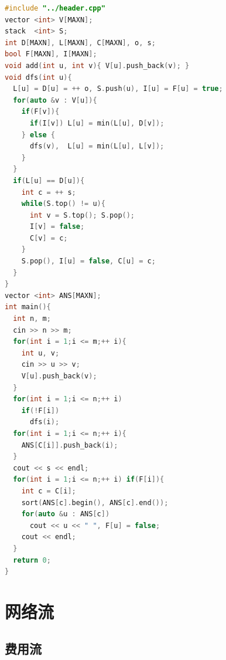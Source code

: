 \documentclass[10pt]{ctexart}
\begin{document}
\begin{multicols}{3}
\begin{lstlisting}[language={C++}]
#include "../header.cpp"
vector <int> V[MAXN];
stack  <int> S;
int D[MAXN], L[MAXN], C[MAXN], o, s;
bool F[MAXN], I[MAXN];
void add(int u, int v){ V[u].push_back(v); }
void dfs(int u){
  L[u] = D[u] = ++ o, S.push(u), I[u] = F[u] = true;
  for(auto &v : V[u]){
    if(F[v]){
      if(I[v]) L[u] = min(L[u], D[v]);
    } else {
      dfs(v),  L[u] = min(L[u], L[v]);
    }
  }
  if(L[u] == D[u]){
    int c = ++ s;
    while(S.top() != u){
      int v = S.top(); S.pop();
      I[v] = false;
      C[v] = c;
    }
    S.pop(), I[u] = false, C[u] = c;
  }
}
vector <int> ANS[MAXN];
int main(){
  int n, m;
  cin >> n >> m;
  for(int i = 1;i <= m;++ i){
    int u, v;
    cin >> u >> v;
    V[u].push_back(v);
  }
  for(int i = 1;i <= n;++ i)
    if(!F[i])
      dfs(i);
  for(int i = 1;i <= n;++ i){
    ANS[C[i]].push_back(i);
  }
  cout << s << endl;
  for(int i = 1;i <= n;++ i) if(F[i]){
    int c = C[i];
    sort(ANS[c].begin(), ANS[c].end());
    for(auto &u : ANS[c])
      cout << u << " ", F[u] = false;
    cout << endl;
  }
  return 0;
}
\end{lstlisting}

    \section{网络流}\label{ux7f51ux7edcux6d41}

    \subsection{费用流}\label{ux8d39ux7528ux6d41}


\end{multicols}
\end{document}
